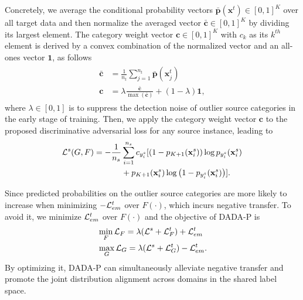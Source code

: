 \documentclass[letterpaper]{article} \usepackage{aaai20}  \usepackage{times}  \usepackage{helvet} \usepackage{courier}  \usepackage[hyphens]{url}  \usepackage{graphicx} \urlstyle{rm} \def\UrlFont{\rm}  \usepackage{graphicx}  \frenchspacing  \setlength{\pdfpagewidth}{8.5in}  \setlength{\pdfpageheight}{11in}
\begin{document}
Concretely, we average the conditional probability vectors $\bar{\mathbf{p}}(\mathbf{x}^t) \in [0, 1]^K$ over all target data and then normalize the averaged vector $\bar{\mathbf{c}} \in [0, 1]^K$ by dividing its largest element. The category weight vector $\mathbf{c} \in [0, 1]^K$ with $c_k$ as its $k^{th}$ element is derived by a convex combination of the normalized vector and an all-ones vector $\mathbf{1}$, as follows 
\begin{eqnarray}\label{EqnAvgCateWeightOverTarget}
\begin{aligned}
\bar{\mathbf{c}} &= \frac{1}{n_t} \sum_{j=1}^{n_t} \bar{\mathbf{p}}(\mathbf{x}_j^t) \\
\mathbf{c} &= \lambda \frac{\bar{\mathbf{c}}}{\max(\bar{\mathbf{c}})} + (1 - \lambda) \mathbf{1}, 
\end{aligned}
\end{eqnarray}
where $\lambda \in [0,1]$ is to suppress the detection noise of outlier source categories in the early stage of training. Then, we apply the category weight vector $\mathbf{c}$ to the proposed discriminative adversarial loss for any source instance, leading to 
\begin{align}
{\cal{L}}^s (G, F) = - \frac{1}{n_s} & \sum_{i=1}^{n_s} c_{y_i^s}[\left(1 - p_{K+1}(\mathbf{x}_i^s)\right)\log p_{y_i^s}(\mathbf{x}_i^s) \nonumber \\ & + p_{K+1}(\mathbf{x}_i^s)\log\left(1 - p_{y_i^s}(\mathbf{x}_i^s)\right)]. \label{EqnWDAdversarialLossOnSource}
\end{align}


Since predicted probabilities on the outlier source categories are more likely to increase when minimizing $-{\cal{L}}_{em}^t$ over $F(\cdot)$, which incurs negative transfer. To avoid it, we minimize ${\cal{L}}_{em}^t$ over $F(\cdot)$ and the objective of DADA-P is 
\begin{eqnarray}\label{EqnPartialOverallLoss}
\begin{aligned}
&\min_{F} {\cal{L}}_F = \lambda ({\cal{L}}^s + {\cal{L}}^t_{F}) + {\cal{L}}_{em}^t \\
&\max_{G} {\cal{L}}_G = \lambda ({\cal{L}}^s + {\cal{L}}^t_{G}) - {\cal{L}}_{em}^t. 
\end{aligned}
\end{eqnarray}
By optimizing it, DADA-P can simultaneously alleviate negative transfer and promote the joint distribution alignment across domains in the shared label space.
\end{document}
